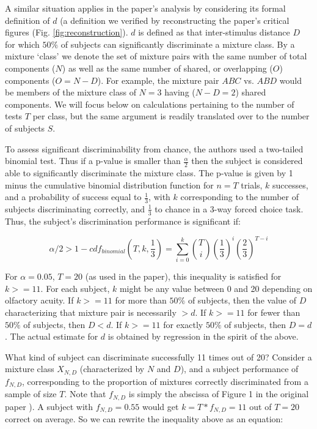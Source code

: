 \documentclass[letterpaper,twocolumn,10pt]{article}
\begin{document}
A similar situation applies in the paper's analysis by considering its formal definition of $d$ 
(a definition we verified by reconstructing the paper's critical figures (Fig. \ref{fig:reconstruction}). 
$d$ is defined as that inter-stimulus distance $D$ for which $50\%$ of subjects can significantly discriminate a mixture class. 
By a mixture `class' we denote the set of mixture pairs with the same number of total components ($N$) 
as well as the same number of shared, or overlapping ($O$) components ($O=N-D$). 
For example, the mixture pair $ABC$ vs. $ABD$ would be members of the mixture class of $N=3$ having ($N-D=2$) shared components. 
We will focus below on calculations pertaining to the number of tests $T$ per class, 
but the same argument is readily translated over to the number of subjects $S$.

To assess significant discriminability from chance, 
the authors used a two-tailed binomial test. 
Thus if a p-value is smaller than $\frac{\alpha}{2}$ then the subject is considered able to significantly discriminate the mixture class.  
The p-value is given by 1 minus the cumulative binomial distribution function for $n=T$ trials, $k$ successes, 
and a probability of success equal to $\frac{1}{3}$, 
with $k$ corresponding to the number of subjects discriminating correctly, and $\frac{1}{3}$ to chance in a 3-way forced choice task.  
Thus, the subject's discrimination performance is significant if: 

\begin{equation}
\label{eq:analytical1}
\alpha/2 > 1 - cdf_{binomial}(T,k,\frac{1}{3}) = \sum_{i=0}^{k} \binom{T}{i}(\frac{1}{3})^{i}(\frac{2}{3})^{T-i}
\end{equation}

For $\alpha=0.05$, $T=20$ (as used in the paper), this inequality is satisfied for $k>=11$.  
For each subject, $k$ might be any value between 0 and 20 depending on olfactory acuity.  
If $k>=11$ for more than $50\%$ of subjects, 
then the value of $D$ characterizing that mixture pair is necessarily $>d$.  
If $k>=11$ for fewer than $50\%$ of subjects, then $D<d$.  
If $k>=11$ for exactly $50\%$ of subjects, then $D=d$.  
The actual estimate for $d$ is obtained by regression in the spirit of the above.  

What kind of subject can discriminate successfully 11 times out of 20?  
Consider a mixture class $X_{N,D}$ (characterized by $N$ and $D$), 
and a subject performance of $f_{N,D}$, 
corresponding to the proportion of mixtures correctly discriminated from a sample of size $T$.  
Note that $f_{N,D}$ is simply the abscissa of Figure 1 in the original paper \cite{bushdid_humans_2014}).   
A subject with $f_{N,D}=0.55$ would get $k=T*f_{N,D}=11$ out of $T=20$ correct on average.  
So we can rewrite the inequality above as an equation:  
\end{document}

